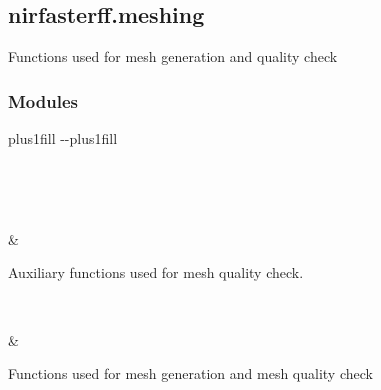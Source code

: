 \documentclass[letterpaper,10pt,english]{sphinxmanual}
\begin{document}
\subsection{nirfasterff.meshing}
\label{\detokenize{_autosummary/nirfasterff.meshing:module-nirfasterff.meshing}}\label{\detokenize{_autosummary/nirfasterff.meshing:nirfasterff-meshing}}\label{\detokenize{_autosummary/nirfasterff.meshing::doc}}
\sphinxAtStartPar
Functions used for mesh generation and quality check
\subsubsection*{Modules}


\begin{savenotes}
\sphinxatlongtablestart
\sphinxthistablewithglobalstyle
\sphinxthistablewithnovlinesstyle
\makeatletter
  \LTleft \@totalleftmargin plus1fill
  \LTright\dimexpr\columnwidth-\@totalleftmargin-\linewidth\relax plus1fill
\makeatother
\begin{longtable}{}
\sphinxtoprule
\endfirsthead

\\
\sphinxtoprule
\endhead

\sphinxbottomrule
{}\\
\endfoot

\endlastfoot
\sphinxtableatstartofbodyhook
\begin{varwidth}[t]{}
\sphinxAtStartPar
{\hyperref[\detokenize{_autosummary/nirfasterff.meshing.auxiliary:module-nirfasterff.meshing.auxiliary}]{}}
\sphinxbeforeendvarwidth
\end{varwidth}%
&\begin{varwidth}[t]{}
\sphinxAtStartPar
Auxiliary functions used for mesh quality check.
\sphinxbeforeendvarwidth
\end{varwidth}%
\\
\sphinxhline\begin{varwidth}[t]{}
\sphinxAtStartPar
{\hyperref[\detokenize{_autosummary/nirfasterff.meshing.meshutils:module-nirfasterff.meshing.meshutils}]{}}
\sphinxbeforeendvarwidth
\end{varwidth}%
&\begin{varwidth}[t]{}
\sphinxAtStartPar
Functions used for mesh generation and mesh quality check
\sphinxbeforeendvarwidth
\end{varwidth}%
\\
\sphinxbottomrule
\end{longtable}
\sphinxtableafterendhook
\sphinxatlongtableend
\end{savenotes}
\end{document}

